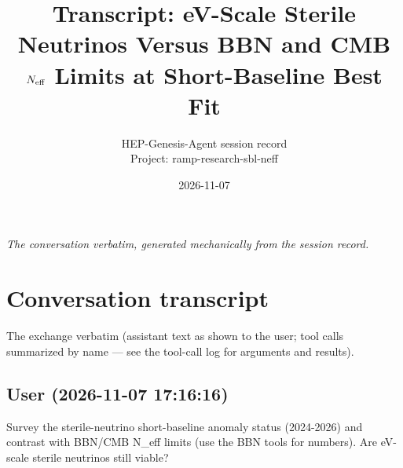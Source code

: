 \documentclass[11pt,a4paper]{article}
\title{Transcript: eV-Scale Sterile Neutrinos Versus BBN and CMB $N_{\rm eff}$ Limits at Short-Baseline Best Fit}
\author{HEP-Genesis-Agent session record \\ \small Project: ramp-research-sbl-neff}
\date{2026-11-07}
\begin{document}
\maketitle
\noindent\textit{\small The conversation verbatim, generated mechanically from the session record.}
\vspace{1em}



\appendix
\section{Conversation transcript}
\label{app:transcript}
The exchange verbatim (assistant text as shown to the user; tool calls summarized by name --- see the tool-call log for arguments and results).
\subsection*{User \small(2026-11-07 17:16:16)}
Survey the sterile-neutrino short-baseline anomaly status (2024-2026) and contrast with BBN/CMB N\_eff limits (use the BBN tools for numbers). Are eV-scale sterile neutrinos still viable?
\end{document}
